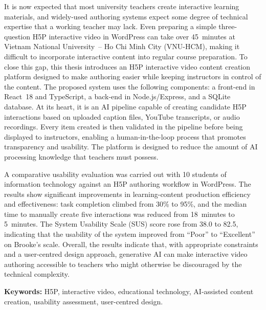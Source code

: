 It is now expected that most university teachers create interactive learning materials, and
widely-used authoring systems expect some degree of technical expertise that a working
teacher may lack. Even preparing a simple three-question H5P interactive video in WordPress
can take over 45~minutes at Vietnam National University~-- Ho Chi Minh City (VNU-HCM),
making it difficult to incorporate interactive content into regular course preparation. To
close this gap, this thesis introduces an H5P interactive video content creation
platform designed to make authoring easier while keeping instructors in control of the
content. The proposed system uses the following components:
a front-end in React~18 and TypeScript, a back-end in Node.js/Express, and a SQLite
database. At its heart, it is an AI pipeline capable of creating candidate H5P interactions
based on uploaded caption files, YouTube transcripts, or audio recordings. Every item
created is then validated in the pipeline before being displayed to instructors, enabling a
human-in-the-loop process that promotes transparency and usability. The platform is
designed to reduce the amount of AI processing knowledge that teachers must possess.

A comparative usability evaluation was carried out with 10 students of information
technology against an H5P authoring workflow in WordPress. The results show significant
improvements in learning-content production efficiency and effectiveness: task completion
climbed from 30\% to 95\%, and the median time to manually create five interactions was
reduced from 18~minutes to 5~minutes. The System Usability Scale (SUS) score rose from 38.0 to
82.5, indicating that the usability of the system improved from ``Poor'' to ``Excellent'' on
Brooke's scale. Overall, the results indicate that, with appropriate constraints and a
user-centred design approach, generative AI can make interactive video authoring accessible
to teachers who might otherwise be discouraged by the technical complexity.

\bigskip
\noindent
\textbf{Keywords:} H5P, interactive video, educational technology, AI-assisted content creation, usability assessment, user-centred design.
